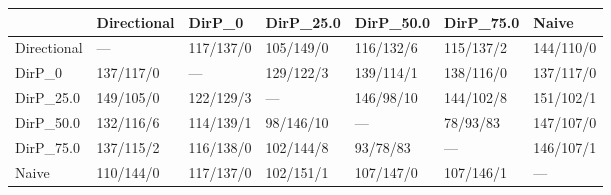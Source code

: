 \begin{tabular}{lllllll}
\toprule
{} & Directional &     DirP\_0 &  DirP\_25.0 &  DirP\_50.0 &  DirP\_75.0 &      Naive \\
\midrule
Directional &         --- &  117/137/0 &  105/149/0 &  116/132/6 &  115/137/2 &  144/110/0 \\
DirP\_0      &   137/117/0 &        --- &  129/122/3 &  139/114/1 &  138/116/0 &  137/117/0 \\
DirP\_25.0   &   149/105/0 &  122/129/3 &        --- &  146/98/10 &  144/102/8 &  151/102/1 \\
DirP\_50.0   &   132/116/6 &  114/139/1 &  98/146/10 &        --- &   78/93/83 &  147/107/0 \\
DirP\_75.0   &   137/115/2 &  116/138/0 &  102/144/8 &   93/78/83 &        --- &  146/107/1 \\
Naive       &   110/144/0 &  117/137/0 &  102/151/1 &  107/147/0 &  107/146/1 &        --- \\
\bottomrule
\end{tabular}
